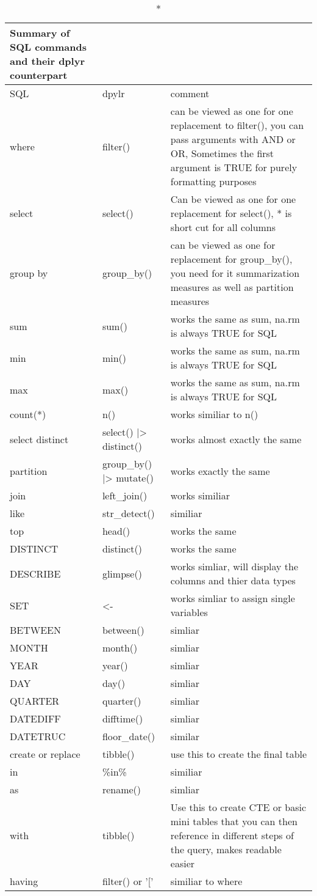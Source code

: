 \documentclass[
  letterpaper,
  DIV=11,
  numbers=noendperiod]{scrreprt}
\begin{document}
\begin{tcolorbox}
\begin{longtable*}{lll}
\caption*{
{\large Summary of SQL commands and their dplyr counterpart}
} \\ 
\toprule
SQL & dpylr & comment \\ 
\midrule\addlinespace[2.5pt]
where & filter() & can be viewed as one for one replacement to filter(), you can pass arguments with AND or OR,
Sometimes the first argument is TRUE for purely formatting purposes \\ 
select & select() & Can be viewed as one for one replacement for select(), * is short cut for all columns \\ 
group by & group\_by() & can be viewed as one for replacement for group\_by(), you need for it summarization measures as well as partition measures  \\ 
sum & sum() & works the same as sum, na.rm is always TRUE for SQL \\ 
min & min() & works the same as sum, na.rm is always TRUE for SQL \\ 
max & max() & works the same as sum, na.rm is always TRUE for SQL \\ 
count(*) & n() & works similiar to n() \\ 
select distinct & select() |> distinct() & works almost exactly the same \\ 
partition & group\_by() |> mutate() & works exactly the same  \\ 
join & left\_join() & works similiar \\ 
like & str\_detect() & similiar \\ 
top & head() & works the same \\ 
DISTINCT & distinct() & works the same \\ 
DESCRIBE & glimpse() & works simliar, will display the columns and thier data types \\ 
SET &  <-  & works simliar to assign single variables \\ 
BETWEEN & between() & simliar \\ 
MONTH & month() & simliar \\ 
YEAR & year() & simliar \\ 
DAY & day() & simliar \\ 
QUARTER & quarter() & simliar \\ 
DATEDIFF & difftime()  & simliar \\ 
DATETRUC & floor\_date() & similar \\ 
create or replace & tibble() & use this to create the final table \\ 
in &  \%in\% & similiar \\ 
as & rename() & simliar \\ 
with & tibble() & Use this to create CTE or basic mini tables that you can then reference in different steps of the query, makes readable easier \\ 
having & filter() or '[' &  similiar to where \\ 
\bottomrule
\end{longtable*}


\end{tcolorbox}
\end{document}
